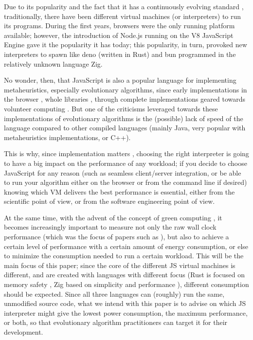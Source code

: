 \documentclass[a4paper,twoside]{article}
\begin{document}
Due to its popularity and the fact that it has a
continuously evolving standard \cite{ecma1999262}, traditionally, there have
been different virtual machines (or interpreters) to run its programs. During
the first years, browsers were the only running platform available; however, the
introduction of Node.js running on the V8 JavaScript Engine \cite{5617064} gave
it the popularity it has today; this popularity, in turn, provoked new
interpreters to spawn like {\sf deno} \cite{runtimeintroducing} (written in
Rust) and {\sf bun} \cite{bun} programmed in the relatively unknown language
Zig.

No wonder, then, that JavaScript is also a popular language for implementing
metaheuristics, especially evolutionary algorithms, since early implementations
in the browser \cite{smith1996ga,jesusIWANN99,langdon2004global}, whole
libraries \cite{EvoStar2014:jsEO}, through complete implementations geared
towards volunteer computing \cite{2016arXiv160101607M}. But one of the
criticisms leveraged towards these implementations of evolutionary algorithms
is the (possible) lack of speed of the language compared to other compiled
languages (mainly Java, very popular with metaheuristics implementations, or
C++).

This is why, since implementation matters \cite{DBLP:conf/iwann/MereloRACML11},
choosing the right interpreter is going to have a big impact on the performance
of any workload; if you decide to choose JavaScript for any reason (such as
seamless client/server integration, or be able to run your algorithm either on
the browser or from the command line if desired) knowing which VM delivers the
best performance is essential, either from the scientific point of view, or
from the software engineering point of view.

At the same time, with the advent of the concept of green computing
\cite{kurp2008green}, it becomes increasingly important to measure not only the
raw wall clock performance (which was the focus of papers such as
\cite{DBLP:conf/evoW/GuervosBCRGRVHR17}), but also to achieve a certain level
of performance with a certain amount of energy consumption, or else to minimize
the consumption needed to run a certain workload. This will be the main focus
of this paper; since the core of the different JS virtual machines is
different, and are created with languages with different focus (Rust is focused
on memory safety \cite{noseda2022rust}, Zig based on simplicity and performance
\cite{zig}), different consumption should be expected. Since all three
languages can (roughly) run the same, unmodified source code, what we intend
with this paper is to advise on which JS interpreter might give the lowest
power consumption, the maximum performance, or both, so that evolutionary
algorithm practitioners can target it for their development.
\end{document}
